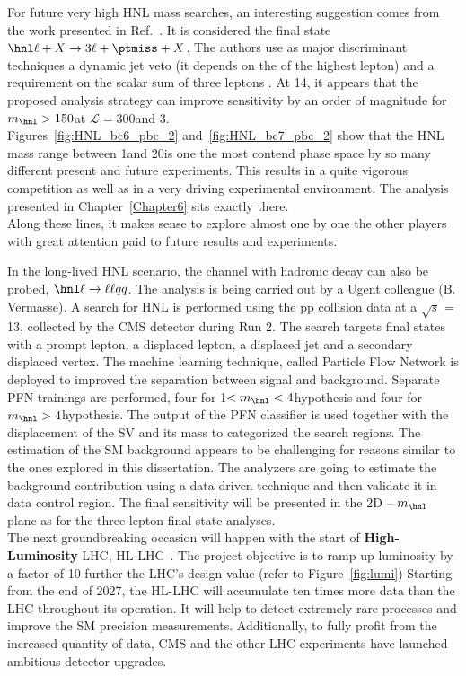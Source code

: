 For future very high HNL mass searches, an interesting suggestion comes from
the work presented in Ref.~\cite{Pascoli_2019}. It is considered the
final state $\hnl \ell + X\rightarrow 3\ell + \ptmiss + X$. The
authors use as major
discriminant techniques a dynamic
jet veto (\ie it depends on the \pt of the highest \pt lepton) and a
requirement on the scalar sum of three leptons \pt. At 14\TeV, it appears that
the proposed analysis strategy can
improve sensitivity by an order of
magnitude for $m_\hnl > 150$\GeV at $\mathcal{L} = 300$\fbinv and
3\abinv. \\

Figures~\ref{fig:HNL_bc6_pbc_2} and~\ref{fig:HNL_bc7_pbc_2} show that
the HNL mass range between 1\GeV and 20\GeV is one the most contend phase
space by so many different present and future experiments. This
results in a quite vigorous competition as well as in a very driving
experimental environment. The analysis presented in Chapter~\ref{Chapter6} sits exactly there. \\
Along these lines, it makes sense to explore almost one by one the
other players with great attention paid to future results and experiments.

In the long-lived HNL scenario, the channel with hadronic \PW decay
can also be probed, \ie $\hnl \ell \rightarrow \ell \ell q q $. The analysis is being carried out by a Ugent
colleague (B. Vermasse). A search for HNL is performed using the pp collision
data at a $\sqrt{s}$ = 13\TeV, collected by the CMS detector during Run
2. The search targets final states with a prompt lepton, a displaced lepton, a
displaced jet and a secondary displaced vertex. The machine
learning technique, called Particle Flow Network is deployed to
improved the separation between signal and background.
Separate PFN trainings
are performed, four for 1\GeV $< m_\hnl < 4$\GeV hypothesis and four for $m_\hnl > 4$\GeV hypothesis.
The output of the PFN classifier is used together with the
displacement of the SV and its mass to categorized the search regions.
The estimation of the SM background appears to be challenging for
reasons similar to the ones explored in this dissertation. The
analyzers are going to estimate the background contribution using a data-driven 
technique and then validate it in data control region. The
final sensitivity will be presented in the 2D \mixpar -- $m_\hnl$
plane as for the three lepton final state analyses.\\

The next groundbreaking occasion will happen with the start of
\textbf{High-Luminosity} LHC,
HL-LHC~\cite{ZurbanoFernandez:2020cco}. The project objective is to
ramp up luminosity by a factor of 10 further the LHC’s design value
(refer to Figure~\ref{fig:lumi})
Starting from the end of 2027, the HL-LHC will accumulate ten times
more data than the LHC throughout its operation. It will help to
detect extremely rare processes and improve the SM precision
measurements. Additionally, to fully profit from the increased quantity of data, CMS and the other
LHC experiments have launched ambitious detector upgrades.

